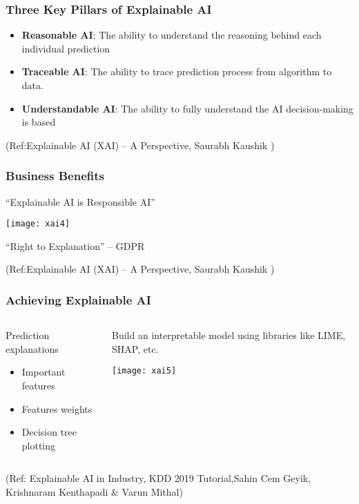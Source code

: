 \begin{frame}[fragile]\frametitle{Three Key Pillars of Explainable AI}
\begin{itemize}
\item {\bf Reasonable AI}: The ability to understand the reasoning behind each individual prediction
\item {\bf Traceable AI}: The ability to trace prediction process from algorithm to data. 
\item {\bf Understandable AI}: The ability to fully understand the AI decision-making is based

\end{itemize}

\tiny{(Ref:Explainable AI (XAI) – A Perspective, Saurabh Kaushik  )}

\end{frame}

\begin{frame}[fragile]\frametitle{Business Benefits}
“Explainable AI is Responsible AI”

\begin{center}
\texttt{[image: xai4]}
\end{center}

“Right to Explanation” – GDPR 

\tiny{(Ref:Explainable AI (XAI) – A Perspective, Saurabh Kaushik  )}

\end{frame}

\begin{frame}[fragile]\frametitle{Achieving Explainable AI}
\begin{columns}
    \begin{column}[T]{0.6\linewidth}
		Prediction explanations

				\begin{itemize}
				\item Important features
				\item Features weights
				\item Decision tree plotting
				\end{itemize}
				
    \end{column}
    \begin{column}[T]{0.4\linewidth}
		Build an interpretable model using libraries like LIME, SHAP, etc.

      \begin{center}
      \texttt{[image: xai5]}
	  	\end{center}
    \end{column}
  \end{columns}
  
\tiny{(Ref: Explainable AI in Industry, KDD 2019 Tutorial,Sahin Cem Geyik, Krishnaram Kenthapadi \& Varun Mithal)}
\end{frame}

